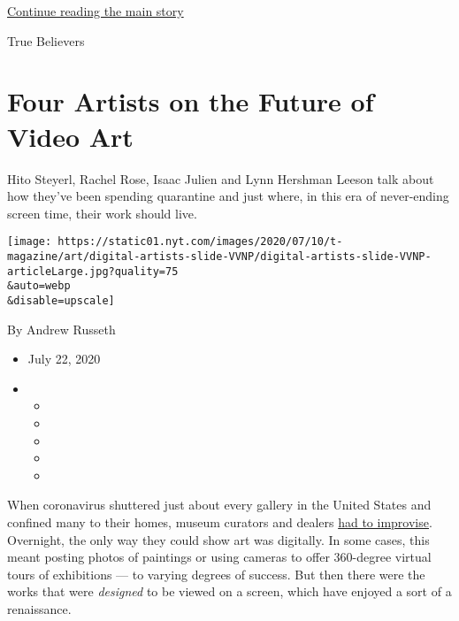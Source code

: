 \protect\hyperlink{after-sponsor}{Continue reading the main story}

True Believers

\hypertarget{four-artists-on-the-future-of-video-art}{%
\section{Four Artists on the Future of Video
Art}\label{four-artists-on-the-future-of-video-art}}

Hito Steyerl, Rachel Rose, Isaac Julien and Lynn Hershman Leeson talk
about how they've been spending quarantine and just where, in this era
of never-ending screen time, their work should live.

\texttt{[image: https://static01.nyt.com/images/2020/07/10/t-magazine/art/digital-artists-slide-VVNP/digital-artists-slide-VVNP-articleLarge.jpg?quality=75\\\&auto=webp\\\&disable=upscale]}

By Andrew Russeth

\begin{itemize}
\item
  July 22, 2020
\item
  \begin{itemize}
  \item
  \item
  \item
  \item
  \item
  \end{itemize}
\end{itemize}

When coronavirus shuttered just about every gallery in the United States
and confined many to their homes, museum curators and dealers
\href{https://www.nytimes.com/2020/03/16/arts/design/art-galleries-online-viewing-coronavirus.html}{had
to improvise}. Overnight, the only way they could show art was
digitally. In some cases, this meant posting photos of paintings or
using cameras to offer 360-degree virtual tours of exhibitions --- to
varying degrees of success. But then there were the works that were
\emph{designed} to be viewed on a screen, which have enjoyed a sort of a
renaissance.

